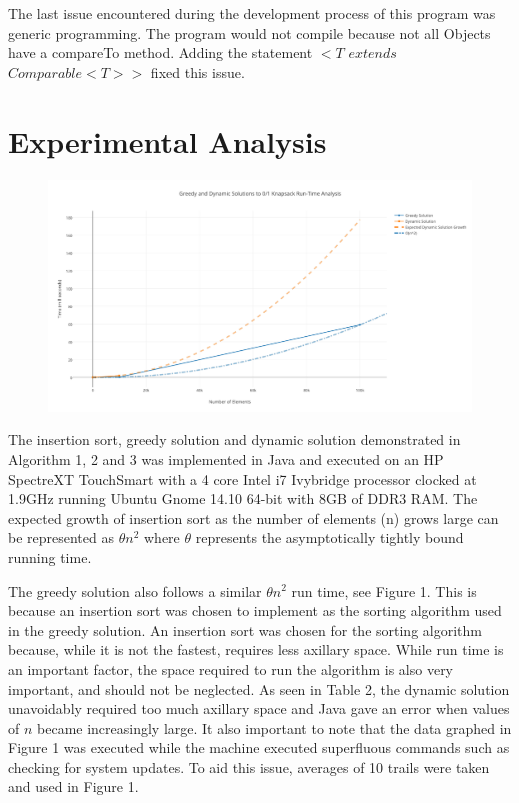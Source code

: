 \documentclass[onecolumn, 12pt, article]{IEEEtran}
\numberwithin{case}{problem}
\numberwithin{condition}{problem}
\numberwithin{condition}{subsection}
\numberwithin{definition}{section}
\theoremstyle{remark}
\numberwithin{question}{problem}
\theoremstyle{plain}
\numberwithin{answer}{problem}
\numberwithin{solution}{section}
\numberwithin{equation}{section}%
\begin{document}
The last issue encountered during the development process of this program was generic programming. The program would not compile because not all Objects have a compareTo method. Adding the statement $<T$ $extends$ $Comparable<T>>$ fixed this issue. \cite{erik}


\section{Experimental Analysis}
\begin{figure}[!]
\begin{center}
\includegraphics[scale=.55]{test-results.pdf}
\end{center}
\label{fig:runtime}
\end{figure}
The insertion sort, greedy solution and dynamic solution demonstrated in Algorithm 1, 2 and 3 was implemented in Java and executed on an HP SpectreXT TouchSmart with a 4 core Intel i7 Ivybridge processor clocked at 1.9GHz running Ubuntu Gnome 14.10 64-bit with 8GB of DDR3 RAM.
The expected growth of insertion sort as the number of elements (n) grows large can be represented as $ \theta{n^2} $ where $ \theta{} $ represents the asymptotically tightly bound running time. \cite{textbook}

The greedy solution also follows a similar $ \theta{n^2} $ run time, see Figure 1. This is because an insertion sort was chosen to implement as the sorting algorithm used in the greedy solution. An insertion sort was chosen for the sorting algorithm because, while it is not the fastest, requires less axillary space. While run time is an important factor, the space required to run the algorithm is also very important, and should not be neglected. As seen in Table 2, the dynamic solution unavoidably required too much axillary space and Java gave an error when values of $n$ became increasingly large. It also important to note that the data graphed in Figure 1 was executed while the machine executed superfluous commands such as checking for system updates. To aid this issue, averages of 10 trails were taken and used in Figure 1.
\end{document}
